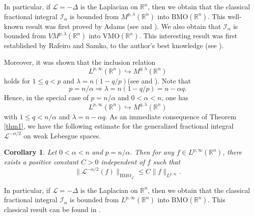 \documentclass[10pt, reqno]{amsart}
\newtheorem{corollary}[theorem]{Corollary}
\theoremstyle{definition}
\theoremstyle{remark}
\numberwithin{equation}{section}
\begin{document}
In particular, if $\mathcal{L}=-\Delta$ is the Laplacian on $\mathbb R^n$, then we obtain that the classical fractional integral $\mathcal{I}_{\alpha}$ is bounded from ${M}^{p,\lambda}(\mathbb R^n)$ into $\mathrm{BMO}(\mathbb R^n)$. This well-known result was first proved by Adams (see \cite{adams} and \cite{adams1}). We also obtain that $\mathcal{I}_{\alpha}$ is bounded from $V{M}^{p,\lambda}(\mathbb R^n)$ into $\mathrm{VMO}(\mathbb R^n)$. This interesting result was first established by Rafeiro and Samko, to the author's best knowledge (see \cite{Rafeiro}).

Moreover, it was shown that the inclusion relation
\begin{equation*}
L^{p,\infty}(\mathbb R^n)\hookrightarrow M^{q,\lambda}(\mathbb R^n)
\end{equation*}
holds for $1\leq q<p$ and $\lambda=n(1-q/p)$(see \cite[equation (21)]{wang2} and \cite[equation (6.1)]{wang3}). Note that
\begin{equation*}
p=n/{\alpha}\Longrightarrow \lambda=n(1-q/p)=n-\alpha q.
\end{equation*}
Hence, in the special case of $p=n/{\alpha}$ and $0<\alpha<n$, one has
\begin{equation*}
L^{p,\infty}(\mathbb R^n)\hookrightarrow M^{q,\lambda}(\mathbb R^n)
\end{equation*}
with $1\leq q<n/{\alpha}$ and $\lambda=n-\alpha q$. As an immediate consequence of Theorem \ref{thm1}, we have the following estimate for the generalized fractional integral $\mathcal L^{-\alpha/2}$ on weak Lebesgue spaces.
\begin{corollary}\label{thm3}
Let $0<\alpha<n$ and $p=n/{\alpha}$. Then for any $f\in L^{p,\infty}(\mathbb R^n)$, there exists a positive constant $C>0$ independent of $f$ such that
\begin{equation*}
\big\|\mathcal L^{-\alpha/2}(f)\big\|_{\mathrm{BMO}_{\mathcal{L}}}
\leq C\big\|f\big\|_{L^{p,\infty}}.
\end{equation*}
\end{corollary}
In particular, if $\mathcal{L}=-\Delta$ is the Laplacian on $\mathbb R^n$, then we obtain that the classical fractional integral $\mathcal{I}_{\alpha}$ is bounded from $L^{p,\infty}(\mathbb R^n)$ into $\mathrm{BMO}(\mathbb R^n)$. This classical result can be found in  \cite[p.164]{stein}.
\end{document}
